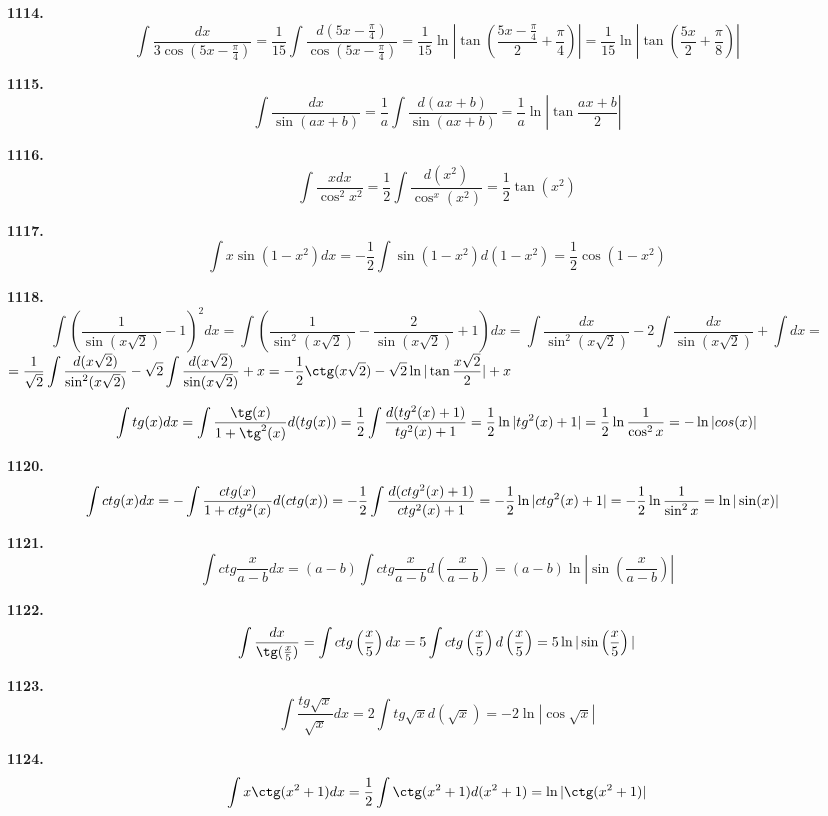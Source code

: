 \documentclass[12pt]{article}
\begin{document}
	{\bf 1114.} \[
		\int \dfrac{dx}{3\cos\left(5x-\frac{\pi}{4}\right)} = \dfrac{1}{15}\int \dfrac{d(5x-\frac{\pi}{4})}{\cos(5x-\frac{\pi}{4})} = \dfrac{1}{15}\ln|\tan(\dfrac{5x-\frac{\pi}{4}}{2}+\dfrac{\pi}{4})| = \dfrac{1}{15}\ln|\tan\left(\dfrac{5x}{2}+\dfrac{\pi}{8}\right)|
	\]
	
	{\bf 1115.} \[
		\int \dfrac{dx}{\sin(ax+b)} = \dfrac{1}{a}\int \dfrac{d(ax+b)}{\sin(ax+b)} = \dfrac{1}{a}\ln|\tan\dfrac{ax+b}{2}|
	\]
	
	{\bf 1116.} \[
		\int \dfrac{x dx}{\cos^2 x^2} = \dfrac{1}{2}\int \dfrac{d(x^2)}{\cos^x(x^2)} = \dfrac{1}{2}\tan(x^2)
	\]
	
	{\bf 1117.} \[
		\int x\sin(1-x^2)dx = -\dfrac{1}{2}\int \sin(1-x^2)d(1-x^2) = \dfrac{1}{2}\cos(1-x^2)
	\]
	
	{\bf 1118.} \[
		\int \left(\dfrac{1}{\sin (x\sqrt{2})}-1\right)^2dx = \int \left(\dfrac{1}{\sin^2(x\sqrt{2})}-\dfrac{2}{\sin(x\sqrt{2})}+1\right)dx = \int \dfrac{dx}{\sin^2(x\sqrt{2})} - 2\int \dfrac{dx}{\sin(x\sqrt{2})} +\int dx = 
	\]
	$
	 \displaystyle= \dfrac{1}{\sqrt{2}}\int \dfrac{d(x\sqrt{2})}{\sin^2(x\sqrt{2})} - \sqrt{2} \int \dfrac{d(x\sqrt{2})}{\sin(x\sqrt{2})} +x = -\dfrac{1}{2}\ctg(x\sqrt{2}) - \sqrt{2}\ln|\tan\dfrac{x\sqrt{2}}{2}|+x 
	$
	
	 \[
		\int tg(x) dx = \int\dfrac{\tg(x)}{1+\tg^2(x)}d(tg(x)) = \dfrac{1}{2}\int \dfrac{d(tg^2(x)+1)}{tg^2(x)+1} = \dfrac{1}{2}\ln|tg^2(x)+1| = \dfrac{1}{2}\ln \dfrac{1}{\cos^2 x} = -\ln|cos(x)|
	\]
	
	{\bf 1120.} \[
		\hspace{-2mm}\int ctg(x)dx = -\int \dfrac{ctg(x)}{1+ctg^2(x)}d(ctg(x)) = -\dfrac{1}{2}\int \dfrac{d(ctg^2(x)+1)}{ctg^2(x)+1} = -\dfrac{1}{2}\ln|ctg^2(x)+1| = -\dfrac{1}{2}\ln \dfrac{1}{\sin^2 x} = \ln|\sin(x)|
	\]
	
	{\bf 1121.} \[
		\int ctg\dfrac{x}{a-b}dx = (a-b)\int ctg\dfrac{x}{a-b}d\left(\dfrac{x}{a-b}\right) = (a-b)\ln |\sin\left(\dfrac{x}{a-b}\right)|
	\]
	
	{\bf 1122.} \[
		\int \dfrac{dx}{\tg(\frac{x}{5})} = \int ctg\left(\dfrac{x}{5}\right)dx = 5\int ctg\left(\dfrac{x}{5}\right)d\left(\dfrac{x}{5}\right) = 5\ln|\sin\left(\dfrac{x}{5}\right)|
	\]
	
	{\bf 1123.} \[
		\int \dfrac{tg\sqrt{x}}{\sqrt{x}}dx = 2\int tg\sqrt{x}d(\sqrt{x}) = -2\ln|\cos\sqrt{x}|
	\]
	
	{\bf 1124.} \[
		\int x \ctg(x^2+1)dx = \dfrac{1}{2}\int \ctg(x^2+1)d(x^2+1) = \ln|\ctg(x^2+1)|
	\]
	
\end{document}

